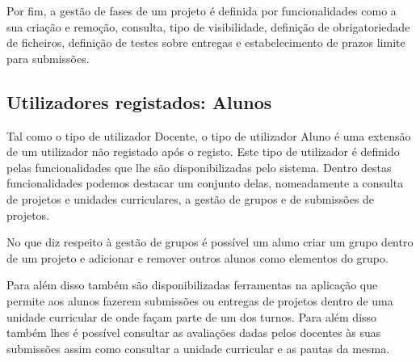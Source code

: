 Por fim, a gestão de fases de um projeto é definida por funcionalidades como a 
sua criação e remoção, consulta, tipo de visibilidade, definição de 
obrigatoriedade de ficheiros, definição de testes sobre entregas e estabelecimento de prazos limite 
para submissões.

\subsection{Utilizadores registados: Alunos}

Tal como o tipo de utilizador Docente, o tipo de utilizador Aluno é uma extensão 
de um utilizador não registado após o registo. Este tipo de utilizador é 
definido pelas funcionalidades que lhe são disponibilizadas pelo sistema. Dentro 
destas funcionalidades podemos destacar um conjunto delas, nomeadamente a 
consulta de projetos e unidades curriculares, a gestão de grupos e de submissões de projetos.

No que diz respeito à gestão de grupos é possível um aluno criar um grupo dentro 
de um projeto e adicionar e remover outros alunos como elementos do grupo.

Para além disso também são disponibilizadas ferramentas na aplicação que permite 
aos alunos fazerem submissões ou entregas de projetos dentro de uma unidade 
curricular de onde façam parte de um dos turnos. Para além disso também lhes é 
possível consultar as avaliações dadas pelos docentes às suas submissões assim 
como consultar a unidade curricular e as pautas da mesma.
